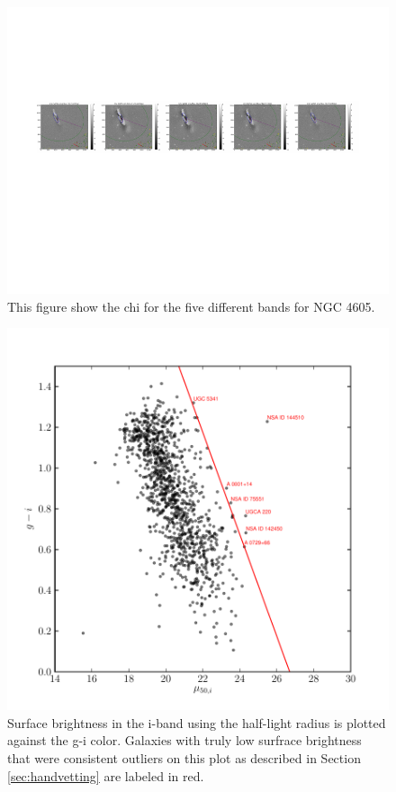 \documentclass[12pt,preprint,pdftex]{aastex}
\begin{document}
\begin{figure}
\centering
\includegraphics[trim = .9cm 4.5cm 0cm 2.9cm,clip=true,width=\textwidth] {goodsingle-colors-chi.pdf}
\caption{This figure show the chi for the five different bands for NGC 4605.}
\label{fig:colorschi}
\end{figure}

\begin{figure}
\centering
\includegraphics[trim= 0mm 0mm 0mm 10mm]{sb_color_outliers.pdf}
\caption{Surface brightness in the i-band using the half-light radius is plotted against the g-i color. Galaxies with truly low surfrace brightness that were consistent outliers on this plot as described in Section \ref{sec:handvetting} are labeled in red.}
\label{fig:outliers}
\end{figure}
\end{document}

